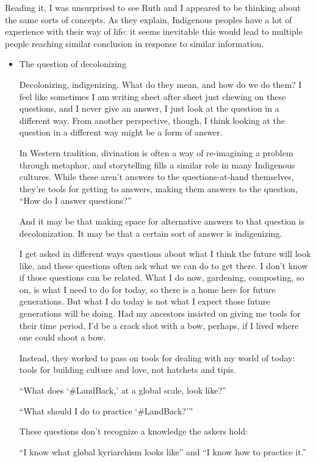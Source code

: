 \documentclass[11pt]{article}
\begin{document}
\begin{itemize}
\begin{itemize}
Reading it, I was unsurprised to see Ruth and I appeared to be thinking about the same sorts of concepts. As they explain, Indigenous peoples have a lot of experience with their way of life: it seems inevitable this would lead to multiple people reaching similar conclusion in response to similar information.
\begin{itemize}
\item The question of decolonizing
\label{sec:orge776a6c}

Decolonizing, indigenizing. What do they mean, and how do we do them? I feel like sometimes I am writing sheet after sheet just chewing on these questions, and I never give an answer, I just look at the question in a different way. From another perspective, though, I think looking at the question in a different way might be a form of answer.

In Western tradition, divination is often a way of re-imagining a problem through metaphor, and storytelling fills a similar role in many Indigenous cultures. While these aren’t answers to the questions-at-hand themselves, they’re tools for getting to answers, making them answers to the question, “How do I answer questions?”

And it may be that making space for alternative answers to that question is decolonization. It may be that a certain sort of answer is indigenizing.

I get asked in different ways questions about what I think the future will look like, and these questions often ask what we can do to get there. I don’t know if those questions can be related. What I do now, gardening, composting, so on, is what I need to do for today, so there is a home here for future generations. But what I do today is not what I expect those future generations will be doing. Had my ancestors insisted on giving me tools for their time period, I’d be a crack shot with a bow, perhaps, if I lived where one could shoot a bow.

Instead, they worked to pass on tools for dealing with my world of today: tools for building culture and love, not hatchets and tipis.

“What does ‘\#LandBack,’ at a global scale, look like?”

“What should I do to practice ‘\#LandBack?'”

These questions don’t recognize a knowledge the askers hold:

“I know what global kyriarchism looks like” and “I know how to practice it.”


\end{itemize}
\end{itemize}
\end{itemize}
\end{document}
